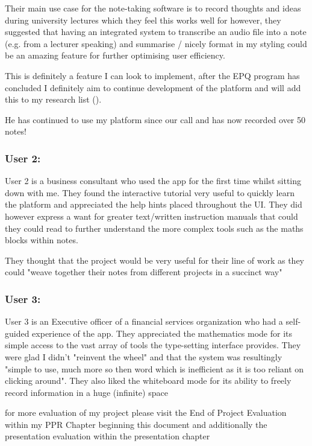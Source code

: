 Their main use case for the note-taking software is to record thoughts and ideas during university lectures which they feel this works well for however, they suggested that having an integrated system to transcribe an audio file into a note (e.g. from a lecturer speaking) and summarise / nicely format in my styling could be an amazing feature for further optimising user efficiency.

This is definitely a feature I can look to implement, after the EPQ program has concluded I definitely aim to continue development of the platform and will add this to my research list ().

He has continued to use my platform since our call and has now recorded over 50 notes!
\subsubsection*{User 2:}
User 2 is a business consultant who used the app for the first time whilst sitting down with me. They found the interactive tutorial very useful to quickly learn the platform and appreciated the help hints placed throughout the UI. They did however express a want for greater text/written instruction manuals that could they could read to further understand the more complex tools such as the maths blocks within notes.

They thought that the project would be very useful for their line of work as they could "weave together their notes from different projects in a succinct way"

\subsubsection*{User 3:}
User 3 is an Executive officer of a financial services organization who had a self-guided experience of the app. They appreciated the mathematics mode for its simple access to the vast array of tools the type-setting interface provides. They were glad I didn't "reinvent the wheel" and that the system was resultingly "simple to use, much more so then word which is inefficient as it is too reliant on clicking around". They also liked the whiteboard mode for its ability to freely record information in a huge (infinite) space


for more evaluation of my project please visit the End of Project Evaluation within my PPR Chapter beginning this document and additionally the presentation evaluation within the presentation chapter 

